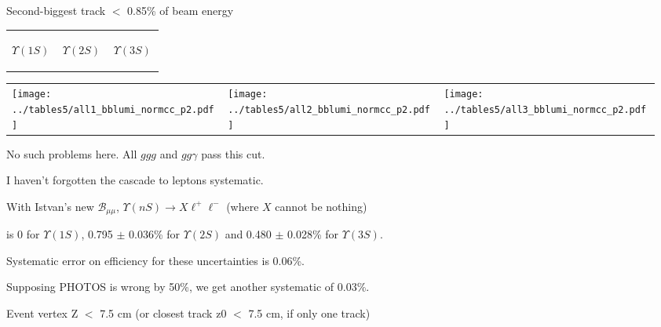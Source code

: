 \documentclass[landscape]{article}
\begin{document}
Second-biggest track $<$ 0.85\% of beam energy

\vspace{-1.75 cm}
\begin{center}
  \begin{tabular}{p{0.32\linewidth} p{0.32\linewidth} p{0.32\linewidth}}
    \begin{center} $\Upsilon(1S)$ \end{center} & \begin{center} $\Upsilon(2S)$ \end{center} & \begin{center} $\Upsilon(3S)$ \end{center} \\
  \end{tabular}

  \vspace{-0.75 cm}
  \begin{tabular}{p{0.32\linewidth} p{0.32\linewidth} p{0.32\linewidth}}
    \texttt{[image: ../tables5/all1\_bblumi\_normcc\_p2.pdf]} &
    \texttt{[image: ../tables5/all2\_bblumi\_normcc\_p2.pdf]} &
    \texttt{[image: ../tables5/all3\_bblumi\_normcc\_p2.pdf]}
  \end{tabular}
\end{center}

\vfill

No such problems here.  All $ggg$ and $gg\gamma$ pass this cut.

\vfill

I haven't forgotten the cascade to leptons systematic.

\vspace{0.5 cm}
With Istvan's new $\mathcal{B}_{\mu\mu}$, $\Upsilon(nS) \to X \ell^+
\ell^-$ (where $X$ cannot be nothing)
\begin{center}
is 0 for $\Upsilon(1S)$, 0.795 $\pm$ 0.036\% for
$\Upsilon(2S)$ and 0.480 $\pm$ 0.028\% for $\Upsilon(3S)$.
\end{center}

\vfill

Systematic error on efficiency for these uncertainties is 0.06\%.

\vfill

Supposing PHOTOS is wrong by 50\%, we get another systematic of
0.03\%.

\pagebreak

Event vertex Z $<$ 7.5 cm (or closest track z0 $<$ 7.5 cm, if only one track)
\end{document}
